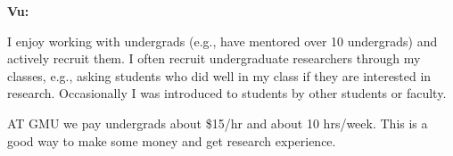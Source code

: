 \documentclass[oneside,11pt]{book}
\newenvironment{commentbox}[1][]{
  \small
  \begin{mybox}
    {\small \textbf{#1}}
  }{
  \end{mybox}
}
\begin{document}
\begin{commentbox}[Vu:] 
    I enjoy working with undergrads (e.g., have mentored over 10 undergrads) and actively recruit them.
    I often recruit undergraduate researchers through my classes, e.g., asking students who did well in my class if they are interested in research.  Occasionally I was introduced to students by other students or faculty.

    AT GMU we pay undergrads about \$15/hr and about 10 hrs/week. This is a good way to make some money and get research experience.
  \end{commentbox}



\end{document}
